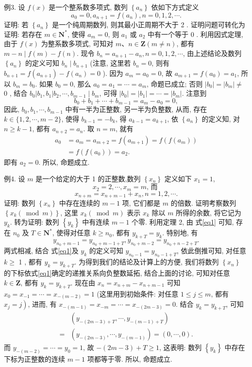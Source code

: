 例3. 设 $f(x)$ 是一个整系数多项式, 数列 $\left\{a_n\right\}$ 依如下方式定义
$$
a_0=0, a_{n+1}=f\left(a_n\right), n=0,1,2, \cdots .
$$
证明: 若 $\left\{a_n\right\}$ 是一个纯周期数列, 则其最小正周期不大于 2 .
证明问题可转化为证明: 若存在 $m \in \mathbf{N}^*$, 使得 $a_m=0$, 则 $a_1$ 或 $a_2$ 中有一个等于 0 .
利用因式定理, 由于 $f(x)$ 为整系数多项式, 可知对 $m 、 n \in \mathbf{Z}(m \neq n)$, 都有 $m-n \mid f(m)-f(n)$.
现令 $b_n=a_{n+1}-a_n, n=0,1,2, \cdots$, 由上述结论及数列 $\left\{a_n\right\}$ 的定义可知 $b_n \mid b_{n+1}$ (注意, 这里若 $b_n=0$, 则有 $b_{n+1}=f\left(a_{n+1}\right)-f\left(a_n\right)=0$ ).
因为 $a_m=a_0=0$, 故 $a_{m+1}=f\left(a_0\right)=a_1$, 所以 $b_m=b_0$.
如果 $b_0=0$, 那么 $a_0=a_1=\cdots=a_m$, 命题已成立; 否则 $\left|b_0\right|=\left|b_m\right| \neq$ 0 , 结合 $b_0\left|b_1, b_1\right| b_2, \cdots, b_{m-1} \mid b_m$, 可得 $\left|b_0\right|=\left|b_1\right|=\cdots=\left|b_m\right|$.
注意到
$$
b_0+b_1+\cdots+b_{m-1}=a_m-a_0=0,
$$
因此, $b_0, b_1, \cdots, b_{m-1}$ 中有一半为正整数, 另一半为负整数, 从而, 存在 $k \in \{1,2, \cdots, m-2\}$, 使得 $b_{k-1}=-b_k$, 得 $a_{k-1}=a_{k+1}$, 依 $\left\{a_n\right\}$ 的定义知, 对 $n \geqslant k-1$, 都有 $a_{n+2}=a_n$. 取 $n=m$, 就有
$$
\begin{aligned}
a_0 & =a_m=a_{m+2}=f\left(a_{m+1}\right)=f\left(f\left(a_m\right)\right) \\
& =f\left(f\left(a_0\right)\right)=a_2 .
\end{aligned}
$$
即有 $a_2=0$.
所以, 命题成立.



例4. 设 $m$ 是一个给定的大于 1 的正整数,数列 $\left\{x_n\right\}$ 定义如下 $x_1=1$,
$$
x_2=2, \cdots, x_m=m \text {, 而 }
$$
$$
x_{n+m}=x_{n+m-1}+x_n, n=1,2, \cdots . \label{eq1}
$$
证明: 数列 $\left\{x_n\right\}$ 中存在连续的 $m-1$ 项, 它们都是 $m$ 的倍数.
证明考察数列 $\left\{x_k(\bmod m)\right\}$, 这里 $x_k(\bmod m)$ 表示 $x_k$ 除以 $m$ 所得的余数, 将它记为 $y_k$. 转为证明: 数列 $\left\{y_k\right\}$ 中有连续 $m-1$ 个零.
利用定理 2, 由 式\ref{eq1} 可知, 存在 $n_0$ 及 $T \in \mathbf{N}^*$, 使得对任意 $k \geqslant n_0$, 都有 $y_{k+T}=y_k$. 特别地, 有
$$
y_{n_0+m-1}=y_{n_0+m-1+T}, y_{n_0+m-2}=y_{n_0+n-2+T} .
$$
两式相减, 结合 式\ref{eq1}及 $y_k$ 的定义可知 $y_{n_0-1}=y_{n_0-1+T}$, 依此倒推可知, 对任意 $k \geqslant$ 1 , 都有 $y_k=y_{k+T}$.
为得到我们的结论及计算上的方便, 我们将数列 $\left\{x_n\right\}$ 的下标依式\ref{eq1}确定的递推关系向负整数延拓, 结合上面的讨论, 可知对任意 $k \in \mathbf{Z}$, 都有 $y_k=y_{k+T}$.
现在由 $x_n=x_{n+m}-x_{n+m-1}$ 可知 $x_0=x_{-1}=\cdots=x_{-(m-2)}=1$ (这里用到初始条件: 对任意 $1 \leqslant j \leqslant m$, 都有 $\left.x_j=j\right)$, 进而, 有 $x_{-(m-1)}=x_{-m}=\cdots= x_{-(2 m-3)}=0$. 结合 $y_k=y_{k+T}$, 可知
$$
\begin{aligned}
& \left(y_{-(2 m-3)+T}, \cdots, y_{-(m-1)+T}\right) \\
= & \left(y_{-(2 m-3)}, \cdots, y_{-(m-1)}\right)=(0, \cdots, 0) .
\end{aligned}
$$
而 $y_{-(m-2)}=\cdots=y_0=1$, 故 $-(2 m-3)+T \geqslant 1$, 这表明: 数列 $\left\{y_k\right\}$ 中存在下标为正整数的连续 $m-1$ 项都等于零.
所以, 命题成立.



